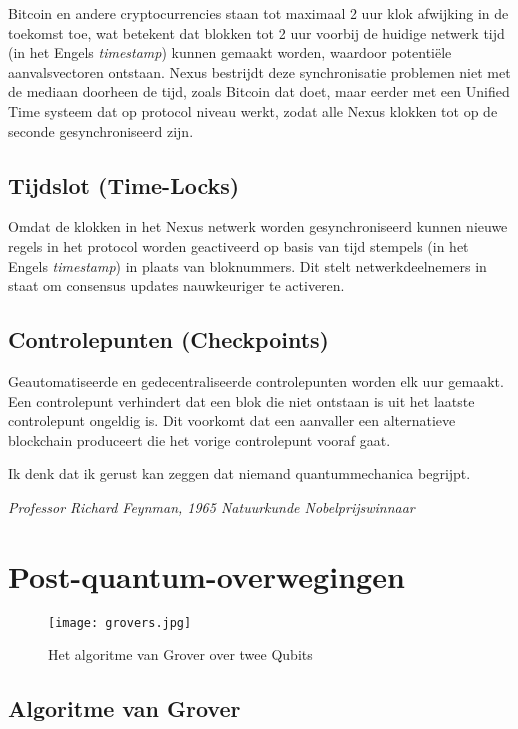 \documentclass[11pt]{article}
\begin{document}
Bitcoin en andere cryptocurrencies staan tot maximaal 2 uur klok afwijking in de toekomst toe, wat betekent dat blokken tot 2 uur voorbij de huidige netwerk tijd (in het Engels \textit{timestamp}) kunnen gemaakt worden, waardoor potenti\"ele aanvalsvectoren ontstaan. 
Nexus bestrijdt deze synchronisatie problemen niet met de mediaan doorheen de tijd, zoals Bitcoin dat doet, maar eerder met een Unified Time systeem dat op protocol niveau werkt, zodat alle Nexus klokken tot op de seconde gesynchroniseerd zijn.

\subsection{Tijdslot (Time-Locks)}

Omdat de klokken in het Nexus netwerk worden gesynchroniseerd kunnen nieuwe regels in het protocol worden geactiveerd op basis van tijd stempels (in het Engels \textit{timestamp}) in plaats van bloknummers. Dit stelt netwerkdeelnemers in staat om consensus updates nauwkeuriger te activeren.


\subsection{Controlepunten (Checkpoints)}

Geautomatiseerde en gedecentraliseerde controlepunten worden elk uur gemaakt. Een controlepunt verhindert dat een blok die niet ontstaan is uit het laatste controlepunt ongeldig is. Dit voorkomt dat een aanvaller een alternatieve blockchain produceert die het vorige controlepunt vooraf gaat.

\bigskip
\epigraph{Ik denk dat ik gerust kan zeggen dat niemand quantummechanica	begrijpt.
}{\textit{\footnotesize{Professor Richard Feynman, 1965 Natuurkunde Nobelprijswinnaar \cite{nobelfeynman}}}}

\pagebreak
\section{Post-quantum-overwegingen}

\begin{wrapfigure}{r}{0.60\textwidth} %
	\vspace{-15pt}
    \centering
    \texttt{[image: grovers.jpg]}
    \caption{Het algoritme van Grover over twee Qubits}
\end{wrapfigure}

\subsection{Algoritme van Grover}
\end{document}
